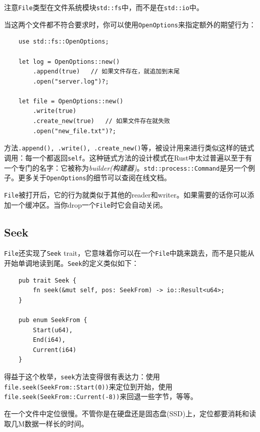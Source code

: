 注意\texttt{File}类型在文件系统模块\texttt{std::fs}中，而不是在\texttt{std::io}中。

当这两个文件都不符合要求时，你可以使用\texttt{OpenOptions}来指定额外的期望行为：
\begin{verbatim}
    use std::fs::OpenOptions;

    let log = OpenOptions::new()
        .append(true)   // 如果文件存在，就追加到末尾
        .open("server.log")?;

    let file = OpenOptions::new()
        .write(true)
        .create_new(true)   // 如果文件存在就失败
        .open("new_file.txt")?;
\end{verbatim}

方法\texttt{.append(), .write(), .create\_new()}等，被设计用来进行类似这样的链式调用：每一个都返回\texttt{self}。这种链式方法的设计模式在Rust中太过普遍以至于有一个专门的名字：它被称为\emph{builder(构建器)}。\texttt{std::process::Command}是另一个例子。更多关于\texttt{OpenOptions}的细节可以查阅在线文档。

\texttt{File}被打开后，它的行为就类似于其他的reader和writer。如果需要的话你可以添加一个缓冲区。当你drop一个\texttt{File}时它会自动关闭。

\subsection{Seek}
\texttt{File}还实现了\texttt{Seek} trait，它意味着你可以在一个\texttt{File}中跳来跳去，而不是只能从开始单调地读到尾。\texttt{Seek}的定义类似如下：
\begin{verbatim}
    pub trait Seek {
        fn seek(&mut self, pos: SeekFrom) -> io::Result<u64>;
    }

    pub enum SeekFrom {
        Start(u64),
        End(i64),
        Current(i64)
    }
\end{verbatim}

得益于这个枚举，\texttt{seek}方法变得很有表达力：使用\texttt{file.seek(SeekFrom::Start(0))}来定位到开始，使用\texttt{file.seek(SeekFrom::Current(-8))}来回退一些字节，等等。

在一个文件中定位很慢。不管你是在硬盘还是固态盘(SSD)上，定位都要消耗和读取几M数据一样长的时间。

